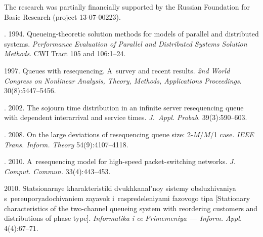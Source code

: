 


\Ack
\noindent
The research was partially financially supported by the Russian Foundation for
Basic Research (project 13-07-00223).


  \begin{multicols}{2}

\renewcommand{\bibname}{\protect\rmfamily References}



{\small\frenchspacing
 {%
 \begin{thebibliography}{99}


. 1994.
Queueing-theoretic solution methods for
models of parallel and distributed systems.
\textit{Performance Evaluation of Parallel and
Distributed Systems Solution Methods}.  CWI Tract 105
and 106:1--24.

 1997.
Queues with resequencing. A~survey and recent results.
\textit{2nd World Congress on Nonlinear
Analysis, Theory, Methods, Applications Proceedings}. 30(8):5447--5456.

. 2002.
The sojourn time distribution in an infinite server
resequencing queue with dependent interarrival and service times.
\textit{J.~Appl. Probab}. 39(3):590--603.

. 2008.
On the large deviations of resequencing
queue size: 2-$M$/$M$/1 case.
\textit{IEEE Trans. Inform. Theory} 54(9):4107--4118.

. 2010.
A~resequencing model for high-speed
packet-switching networks.
\textit{J.~ Comput. Commun.} 33(4):443--453.

 2010.
 Statsionarnye kharakteristiki
dvukh\-ka\-nal'\-noy sistemy obsluzhivaniya s~pe\-re\-upo\-rya\-do\-chi\-va\-ni\-em zayavok
i~raspredeleniyami
fazovogo tipa [Stationary characteristics of the two-channel
queueing system with reordering customers and distributions of phase type].
\textit{Informatika i ee Primemeniya}~--- \textit{Inform. Appl.}
4(4):67--71.


\end{thebibliography}}}
\end{multicols}
